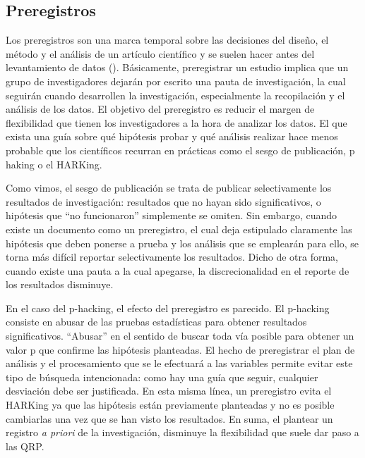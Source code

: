 \documentclass[
  spanish,
  a4paper,
  oneside]{scrbook}
\begin{document}
\subsection{Preregistros}\label{preregistros}

Los preregistros son una marca temporal sobre las decisiones del diseño,
el método y el análisis de un artículo científico y se suelen hacer
antes del levantamiento de datos
().
Básicamente, preregistrar un estudio implica que un grupo de
investigadores dejarán por escrito una pauta de investigación, la cual
seguirán cuando desarrollen la investigación, especialmente la
recopilación y el análisis de los datos. El objetivo del preregistro es
reducir el margen de flexibilidad que tienen los investigadores a la
hora de analizar los datos. El que exista una guía sobre qué hipótesis
probar y qué análisis realizar hace menos probable que los científicos
recurran en prácticas como el sesgo de publicación, p haking o el
HARKing.

Como vimos, el sesgo de publicación se trata de publicar selectivamente
los resultados de investigación: resultados que no hayan sido
significativos, o hipótesis que ``no funcionaron'' simplemente se
omiten. Sin embargo, cuando existe un documento como un preregistro, el
cual deja estipulado claramente las hipótesis que deben ponerse a prueba
y los análisis que se emplearán para ello, se torna más difícil reportar
selectivamente los resultados. Dicho de otra forma, cuando existe una
pauta a la cual apegarse, la discrecionalidad en el reporte de los
resultados disminuye.

En el caso del p-hacking, el efecto del preregistro es parecido. El
p-hacking consiste en abusar de las pruebas estadísticas para obtener
resultados significativos. ``Abusar'' en el sentido de buscar toda vía
posible para obtener un valor p que confirme las hipótesis planteadas.
El hecho de preregistrar el plan de análisis y el procesamiento que se
le efectuará a las variables permite evitar este tipo de búsqueda
intencionada: como hay una guía que seguir, cualquier desviación debe
ser justificada. En esta misma línea, un preregistro evita el HARKing ya
que las hipótesis están previamente planteadas y no es posible
cambiarlas una vez que se han visto los resultados. En suma, el plantear
un registro \emph{a priori} de la investigación, disminuye la
flexibilidad que suele dar paso a las QRP.
\end{document}
